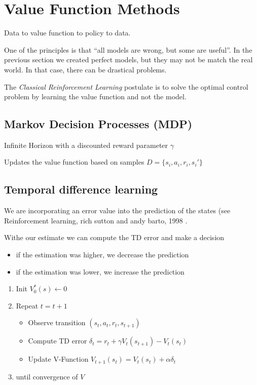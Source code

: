 \documentclass[b5paper]{report}
\begin{document}
\section{Value Function Methods}

Data to value function to policy to data.

One of the principles is that ``all models are wrong, but some are useful''. In
the previous section we created perfect models, but they may not be match the
real world. In that case, there can be drastical problems.

The \emph{Classical Reinforcement Learning} postulate is to solve the optimal
control problem by learning the value function and not the model.

\subsection{Markov Decision Processes (MDP)}

Infinite Horizon with a discounted reward parameter $\gamma$

Updates the value function based on samples $D = \{s_i, a_i, r_i, s_i'\}$

\subsection{Temporal difference learning}

We are incorporating an error value into the prediction of the states (see
  Reinforcement learning, rich sutton and andy barto, 1998
  \cite{sutton1998reinforcement}.

Withe our estimate we can compute the TD error and make a decision

\begin{itemize}
  \item if the estimation was higher, we decrease the prediction
  \item if the estimation was lower, we increase the prediction
\end{itemize}

\begin{enumerate}
  \item Init $V_0^*(s) \leftarrow 0$
  \item Repeat $t=t+1$
    \begin{itemize}
      \item Observe transition $(s_t,a_t,r_t,s_{t+1})$
      \item Compute TD error $\delta_t = r_t + \gamma V_t(s_{t+1}) - V_t(s_t)$
      \item Update V-Function $V_{t+1}(s_t) = V_t(s_t) + \alpha\delta_t$
    \end{itemize}
  \item until convergence of $V$
\end{enumerate}
\end{document}
